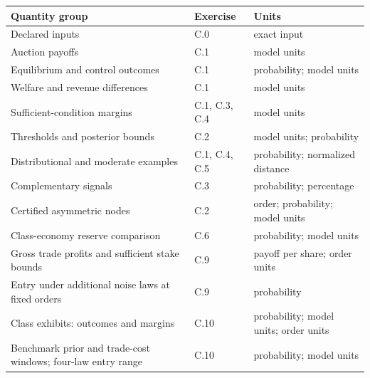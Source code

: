 \documentclass[
  11pt,
]{article}
\newcounter{none} %
\begin{document}
{\def\LTcaptype{none} %
\begin{longtable}[]{@{}
  >{\raggedright\arraybackslash}p{}
  >{\raggedright\arraybackslash}p{}
  >{\raggedright\arraybackslash}p{}@{}}
\toprule\noalign{}
\begin{minipage}[b]{\linewidth}\raggedright
Quantity group
\end{minipage} & \begin{minipage}[b]{\linewidth}\raggedright
Exercise
\end{minipage} & \begin{minipage}[b]{\linewidth}\raggedright
Units
\end{minipage} \\
\midrule\noalign{}
\endhead
\bottomrule\noalign{}
\endlastfoot
Declared inputs & C.0 & exact input \\
Auction payoffs & C.1 & model units \\
Equilibrium and control outcomes & C.1 & probability; model units \\
Welfare and revenue differences & C.1 & model units \\
Sufficient-condition margins & C.1, C.3, C.4 & model units \\
Thresholds and posterior bounds & C.2 & model units; probability \\
Distributional and moderate examples & C.1, C.4, C.5 & probability;
normalized distance \\
Complementary signals & C.3 & probability; percentage \\
Certified asymmetric nodes & C.2 & order; probability; model units \\
Class-economy reserve comparison & C.6 & probability; model units \\
Gross trade profits and sufficient stake bounds & C.9 & payoff per share;
order units \\
Entry under additional noise laws at fixed orders & C.9 & probability \\
Class exhibits: outcomes and margins & C.10 & probability; model units;
order units \\
Benchmark prior and trade-cost windows; four-law entry range & C.10 &
probability; model units \\
\end{longtable}
}
\end{document}
